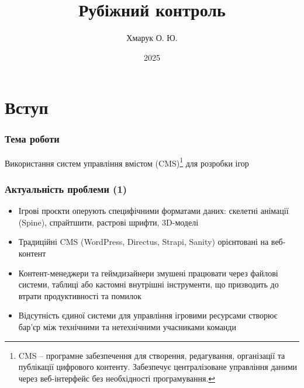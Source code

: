 \documentclass[aspectratio=169]{beamer}
\title{Рубіжний контроль}
\author{Хмарук О. Ю.}
\date{2025}
\begin{document}
\begin{frame}[plain]
  \titlepage
\end{frame}

\section{Вступ}

\begin{frame}
\frametitle{Тема роботи}
  Використання систем управління вмістом (CMS)\footnote{CMS -- програмне забезпечення для створення, редагування, організації та публікації цифрового контенту. Забезпечує централізоване управління даними через веб-інтерфейс без необхідності програмування.} для розробки ігор
\end{frame}

\begin{frame}
\frametitle{Актуальність проблеми (1)}

  \begin{itemize}
    \item Ігрові проєкти оперують специфічними форматами даних: скелетні анімації (Spine), спрайтшити, растрові шрифти, 3D-моделі
    \item Традиційні CMS (WordPress, Directus, Strapi, Sanity) орієнтовані на веб-контент
    \item Контент-менеджери та геймдизайнери змушені працювати через файлові системи, таблиці або кастомні внутрішні інструменти, що призводить до втрати продуктивності та помилок
    \item Відсутність єдиної системи для управління ігровими ресурсами створює бар'єр між технічними та нетехнічними учасниками команди
  \end{itemize}
\end{frame}
\end{document}
